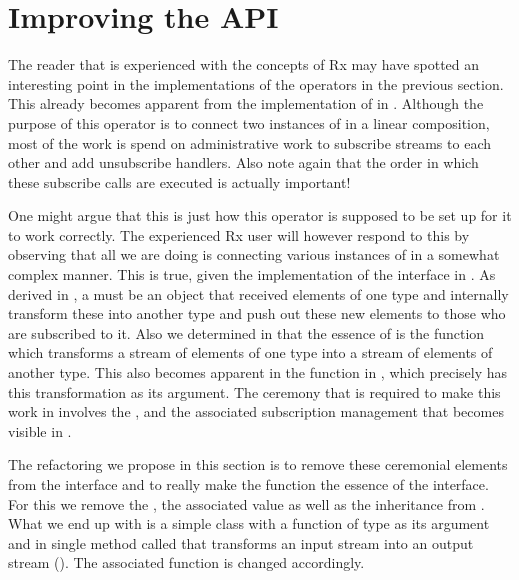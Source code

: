 \section{Improving the API}
The reader that is experienced with the concepts of Rx may have spotted an interesting point in the implementations of the operators in the previous section. This already becomes apparent from the implementation of  in . Although the purpose of this operator is to connect two instances of \comp in a linear composition, most of the work is spend on administrative work to subscribe streams to each other and add unsubscribe handlers. Also note again that the order in which these subscribe calls are executed is actually important!

One might argue that this is just how this operator is supposed to be set up for it to work correctly. The experienced Rx user will however respond to this by observing that all we are doing is connecting various instances of \subj in a somewhat complex manner. This is true, given the implementation of the \comp interface in . As derived in , a \comp must be an object that received elements of one type and internally transform these into another type and push out these new elements to those who are subscribed to it. Also we determined in  that the essence of \comp is the  function which transforms a stream of elements of one type into a stream of elements of another type. This also becomes apparent in the  function in , which precisely has this transformation as its argument. The ceremony that is required to make this work in  involves the \subj, \obv and the associated subscription management that becomes visible in .

The refactoring we propose in this section is to remove these ceremonial elements from the \comp interface and to really make the  function the essence of the interface. For this we remove the \subj, the associated  value as well as the inheritance from . What we end up with is a simple class \comp with a  function of type  as its argument and in single method called  that transforms an input stream into an output stream (). The associated  function is changed accordingly.

